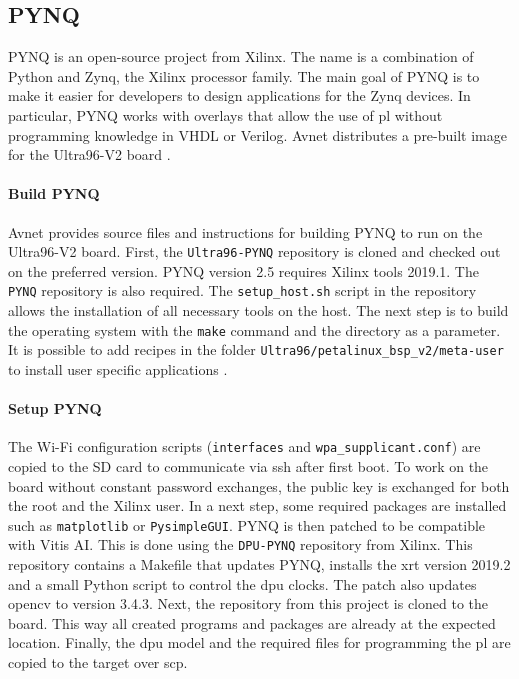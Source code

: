 \subsection{PYNQ}
\label{subsec:embedded_platform:operating_systems:pynq}

PYNQ is an open-source project from Xilinx.
The name is a combination of Python and Zynq, the Xilinx processor family.
The main goal of PYNQ is to make it easier for developers to design applications for the Zynq devices.
In particular, PYNQ works with overlays that allow the use of \acrlong{pl} without programming knowledge in VHDL or Verilog.
Avnet distributes a pre-built image for the Ultra96-V2 board \cite{pynq_intro}.

\paragraph{Build PYNQ}
Avnet provides source files and instructions for building PYNQ to run on the Ultra96-V2 board.
First, the \texttt{Ultra96-PYNQ} repository is cloned and checked out on the preferred version.
PYNQ version 2.5 requires Xilinx tools 2019.1.
The \texttt{PYNQ} repository is also required.
The \texttt{setup\_host.sh} script in the repository allows the installation of all necessary tools on the host.
The next step is to build the operating system with the \texttt{make} command and the directory as a parameter.
It is possible to add recipes in the folder \texttt{Ultra96/petalinux\_bsp\_v2/meta-user} to install user specific applications \cite{avnet_pynq_github}.

\paragraph{Setup PYNQ}
The Wi-Fi configuration scripts (\texttt{interfaces} and \texttt{wpa\_supplicant.conf}) are copied to the SD card to communicate via \acrfull{ssh} after first boot.
To work on the board without constant password exchanges, the public key is exchanged for both the root and the Xilinx user.
In a next step, some required packages are installed such as \texttt{matplotlib} or \texttt{PysimpleGUI}.
PYNQ is then patched to be compatible with Vitis AI.
This is done using the \texttt{DPU-PYNQ} repository from Xilinx.
This repository contains a Makefile that updates PYNQ, installs the \acrfull{xrt} version 2019.2 and a small Python script to control the \acrfull{dpu} clocks.
The patch also updates \acrshort{opencv} to version 3.4.3.
Next, the repository from this project is cloned to the board.
This way all created programs and packages are already at the expected location.
Finally, the \acrshort{dpu} model and the required files for programming the \acrfull{pl} are copied to the target over \acrfull{scp}.

